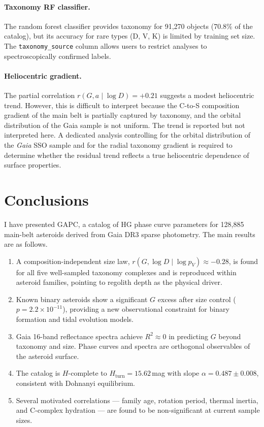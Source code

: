 \documentclass{aa}
\newcommand{\gapc}{GAPC\xspace}
\newcommand{\gaia}{{\it Gaia}\xspace}
\begin{document}
\paragraph{Taxonomy RF classifier.}
The random forest classifier provides taxonomy for 91,270 objects (70.8\%
of the catalog), but its accuracy for rare types (D, V, K) is limited by
training set size.  The \texttt{taxonomy\_source} column allows users to
restrict analyses to spectroscopically confirmed labels.

\paragraph{Heliocentric gradient.}
The partial correlation $r(G, a \mid \log D) = +0.21$ suggests a modest
heliocentric trend.  However, this is difficult to interpret because the
C-to-S composition gradient of the main belt is partially captured by
taxonomy, and the orbital distribution of the Gaia sample is not uniform.
The trend is reported but not interpreted here.  A dedicated analysis
controlling for the orbital distribution of the \gaia SSO sample and
for the radial taxonomy gradient is required to determine whether the
residual trend reflects a true heliocentric dependence of surface
properties.


\section{Conclusions}
\label{sec:conclusions}

I have presented \gapc, a catalog of HG phase curve parameters for
128,885 main-belt asteroids derived from Gaia DR3 sparse photometry.
The main results are as follows.

\begin{enumerate}
\item A composition-independent size law, $r(G, \log D \mid \log p_V)
      \approx -0.28$, is found for all five well-sampled taxonomy complexes
      and is reproduced within asteroid families, pointing to regolith
      depth as the physical driver.

\item Known binary asteroids show a significant $G$ excess after size
      control ($p = 2.2 \times 10^{-11}$), providing a new observational
      constraint for binary formation and tidal evolution models.

\item Gaia 16-band reflectance spectra achieve $R^2 \approx 0$ in
      predicting $G$ beyond taxonomy and size.  Phase curves and spectra
      are orthogonal observables of the asteroid surface.

\item The catalog is $H$-complete to $H_\mathrm{turn} = 15.62$\,mag with
      slope $\alpha = 0.487 \pm 0.008$, consistent with Dohnanyi
      equilibrium.

\item Several motivated correlations — family age, rotation period,
      thermal inertia, and C-complex hydration — are found to be
      non-significant at current sample sizes.
\end{enumerate}
\end{document}
